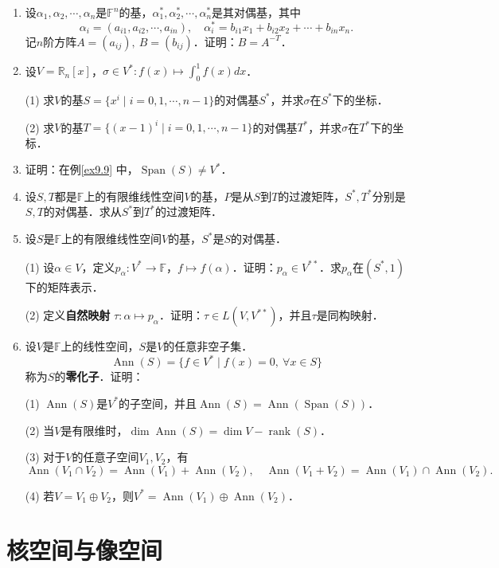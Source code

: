 \documentclass[a4paper,fontset=windows]{ctexbook}
\theoremstyle{definition}
\DeclareMathOperator{\ann}{Ann}
\DeclareMathOperator{\rank}{rank}
\DeclareMathOperator{\Span}{Span}
\begin{document}
\begin{enumerate}
\item 设$\alpha_1,\alpha_2,\cdots,\alpha_n$是$\mathbb{F}^n$的基，$\alpha_1^*,\alpha_2^*,\cdots,\alpha_n^*$是其对偶基，其中
$$\alpha_i=(a_{i1},a_{i2},\cdots,a_{in}),\quad\alpha_i^*=b_{i1}x_1+b_{i2}x_2+\cdots+b_{in}x_n.$$
记$n$阶方阵$A=(a_{ij}),~B=(b_{ij})$．证明：$B=A^{-T}$．

\item 设$V=\mathbb{R}_n[x]$，$\sigma\in V^*:f(x)\mapsto\int_0^1f(x)dx$．

(1) 求$V$的基$S=\{x^i\mid i=0,1,\cdots,n-1\}$的对偶基$S^*$，并求$\sigma$在$S^*$下的坐标．

(2) 求$V$的基$T=\{(x-1)^i\mid i=0,1,\cdots,n-1\}$的对偶基$T^*$，并求$\sigma$在$T^*$下的坐标．

\item 证明：在例\ref{ex9.9} 中，$\Span(S)\ne V^*$．

\item 设$S,T$都是$\mathbb{F}$上的有限维线性空间$V$的基，$P$是从$S$到$T$的过渡矩阵，$S^*,T^*$分别是$S,T$的对偶基．求从$S^*$到$T^*$的过渡矩阵．

\item 设$S$是$\mathbb{F}$上的有限维线性空间$V$的基，$S^*$是$S$的对偶基．

(1) 设$\alpha\in V$，定义$p_\alpha:V^*\to\mathbb{F}$，$f\mapsto f(\alpha)$．证明：$p_\alpha\in V^{**}$．求$p_\alpha$在$(S^*,1)$下的矩阵表示．

(2) 定义{\bf 自然映射} $\tau:\alpha\mapsto p_\alpha$．证明：$\tau\in L(V,V^{**})$，并且$\tau$是同构映射．

\item 设$V$是$\mathbb{F}$上的线性空间，$S$是$V$的任意非空子集．
$$\ann(S)=\{f\in V^*\mid f(x)=0,~\forall x\in S\}$$
称为$S$的{\bf 零化子}．证明：

(1) $\ann(S)$是$V^*$的子空间，并且$\ann(S)=\ann(\Span(S))$．

(2) 当$V$是有限维时，$\dim\ann(S)=\dim V-\rank(S)$．

(3) 对于$V$的任意子空间$V_1,V_2$，有
$$\ann(V_1\cap V_2)=\ann(V_1)+\ann(V_2),\quad\ann(V_1+V_2)=\ann(V_1)\cap\ann(V_2).$$

(4) 若$V=V_1\oplus V_2$，则$V^*=\ann(V_1)\oplus\ann(V_2)$．

\end{enumerate}

\clearpage\section{核空间与像空间}
\end{document}
